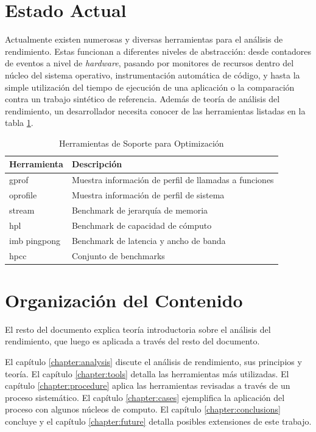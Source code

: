 \documentclass[a4paper]{report}
\begin{document}
\section{Estado Actual}

Actualmente existen numerosas y diversas herramientas para el análisis de rendimiento.
Estas funcionan a diferentes niveles de abstracción: desde contadores de eventos
a nivel de {\it hardware}, pasando por monitores de recursos dentro del núcleo del sistema operativo, instrumentación automática de código, y hasta la simple utilización del tiempo de ejecución de una aplicación o la comparación contra un trabajo sintético de referencia.
Además de teoría de análisis del rendimiento, un desarrollador necesita
conocer de las herramientas listadas en la tabla \ref{table:tools}.

\begin{table}[H]
    \caption{Herramientas de Soporte para Optimización}
    \centering
    \begin{tabular}{|l|l|}\hline
      {\bf Herramienta} & {\bf Descripción} \\ \hline
      gprof & Muestra información de perfil de llamadas a funciones \\ \hline
      oprofile & Muestra información de perfil de sistema \\ \hline
      stream & Benchmark de jerarquía de memoria \\ \hline
      hpl & Benchmark de capacidad de cómputo \\ \hline
      imb pingpong & Benchmark de latencia y ancho de banda \\ \hline
      hpcc & Conjunto de benchmarks \\ \hline
    \end{tabular}
    \label{table:tools}
\end{table}


\section{Organización del Contenido}

El resto del documento explica teoría introductoria sobre el análisis del rendimiento, que luego es aplicada a través del resto del documento.

\bigskip

El capítulo \ref{chapter:analysis} discute el análisis de rendimiento, sus
principios y teoría. El capítulo \ref{chapter:tools} detalla las herramientas más
utilizadas. El capítulo \ref{chapter:procedure} aplica las herramientas revisadas a través de un proceso sistemático. El capítulo \ref{chapter:cases} ejemplifica la aplicación del proceso con algunos núcleos de computo. El capítulo \ref{chapter:conclusions} concluye y el capítulo \ref{chapter:future} detalla posibles extensiones de este trabajo.
\end{document}
